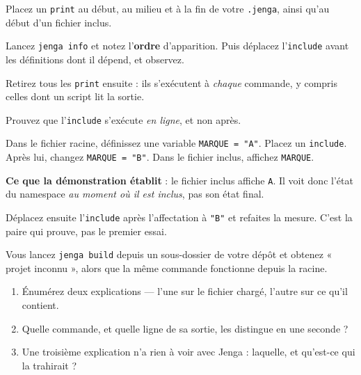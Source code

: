 \begin{nkpratique}
Placez un \texttt{print} au début, au milieu et à la fin de votre
\texttt{.jenga}, ainsi qu'au début d'un fichier inclus.

Lancez \texttt{jenga info} et notez l'\textbf{ordre} d'apparition. Puis déplacez
l'\texttt{include} avant les définitions dont il dépend, et observez.

Retirez tous les \texttt{print} ensuite : ils s'exécutent à \emph{chaque}
commande, y compris celles dont un script lit la sortie.
\end{nkpratique}

\begin{nkdemo}
Prouvez que l'\texttt{include} s'exécute \emph{en ligne}, et non après.

Dans le fichier racine, définissez une variable \texttt{MARQUE = "A"}. Placez un
\texttt{include}. Après lui, changez \texttt{MARQUE = "B"}. Dans le fichier
inclus, affichez \texttt{MARQUE}.

\textbf{Ce que la démonstration établit} : le fichier inclus affiche \texttt{A}.
Il voit donc l'état du namespace \emph{au moment où il est inclus}, pas son état
final.

Déplacez ensuite l'\texttt{include} après l'affectation à \texttt{"B"} et
refaites la mesure. C'est la paire qui prouve, pas le premier essai.
\end{nkdemo}

\begin{nklogique}
Vous lancez \texttt{jenga build} depuis un sous-dossier de votre dépôt et obtenez
« projet inconnu », alors que la même commande fonctionne depuis la racine.

\begin{enumerate}
\item Énumérez deux explications --- l'une sur le fichier chargé, l'autre sur ce
      qu'il contient.
\item Quelle commande, et quelle ligne de sa sortie, les distingue en une
      seconde ?
\item Une troisième explication n'a rien à voir avec Jenga : laquelle, et
      qu'est-ce qui la trahirait ?
\end{enumerate}
\end{nklogique}
